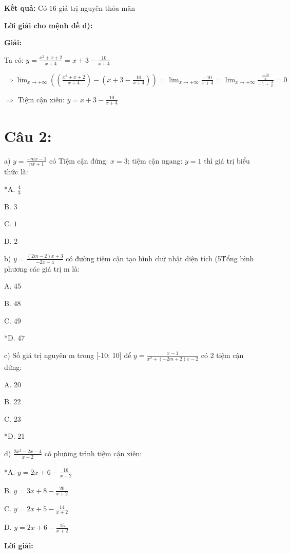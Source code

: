 \documentclass{article}
\begin{document}
\textbf{Kết quả:} Có \(16\) giá trị nguyên thỏa mãn

\textbf{Lời giải cho mệnh đề d):}

\textbf{Giải:}

Ta có: \(y = \frac{x^2 + x + 2}{x + 4} = x + 3 - \frac{10}{x + 4}\)

\(\Rightarrow \displaystyle\lim_{x \to +\infty} \left(\left(\frac{x^2 + x + 2}{x + 4}\right) - \left(x + 3 - \frac{10}{x + 4}\right)\right) = \displaystyle\lim_{x \to +\infty} \frac{-10}{x + 4} = \displaystyle\lim_{x \to +\infty} \frac{\frac{-10}{x}}{-1 + \frac{4}{x}} = 0\)

\(\Rightarrow\) Tiệm cận xiên: \(y = x + 3 - \frac{10}{x + 4}\)



\newpage

\section*{Câu 2:}

a) \(y = \frac{-mx - 1}{nx + 1}\) có Tiệm cận đứng: \(x = 3\); tiệm cận ngang: \(y = 1\) thì giá trị biểu thức là:

*A. \(\frac{4}{3}\)

B. \(3\)

C. \(1\)

D. \(2\)


b) \(y = \frac{(2m - 2)x + 3}{-2x - 4}\) có đường tiệm cận tạo hình chữ nhật diện tích (5\. Tổng bình phương các giá trị m là:

A. \(45\)

B. \(48\)

C. \(49\)

*D. \(47\)


c) Số giá trị nguyên m trong [-10; 10] để \(y = \frac{x - 1}{x^2 + (-2m + 2)x - 2}\) có 2 tiệm cận đứng:

A. 20

B. 22

C. 23

*D. 21


d) \(\frac{2x^2 - 2x - 4}{x + 2}\) có phương trình tiệm cận xiên:

*A. \(y = 2x + 6 - \frac{16}{x + 2}\)

B. \(y = 3x + 8 - \frac{20}{x + 2}\)

C. \(y = 2x + 5 - \frac{14}{x + 2}\)

D. \(y = 2x + 6 - \frac{15}{x + 2}\)


\textbf{Lời giải:}
\end{document}
